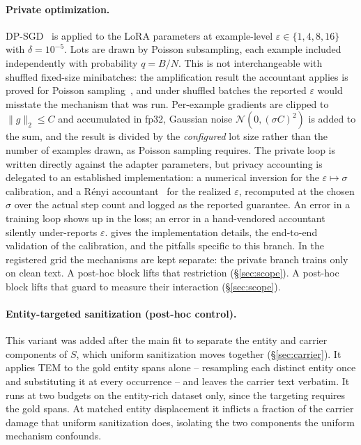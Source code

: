 \paragraph{Private optimization.}
DP-SGD~\citep{abadi2016deep} is applied to the LoRA parameters at example-level $\varepsilon \in \{1, 4, 8, 16\}$ with $\delta = 10^{-5}$.
Lots are drawn by Poisson subsampling,
each example included independently with probability $q = B/N$.
This is not interchangeable with shuffled fixed-size minibatches:
the amplification result the accountant applies is proved for Poisson sampling~\citep{mironov2019sgm},
and under shuffled batches the reported $\varepsilon$ would misstate the mechanism that was run.
Per-example gradients are clipped to $\lVert g \rVert_2 \le C$ and accumulated in fp32,
Gaussian noise $\mathcal{N}(0, (\sigma C)^2)$ is added to the sum,
and the result is divided by the \textit{configured} lot size rather than the number of examples drawn,
as Poisson sampling requires.
The private loop is written directly against the adapter parameters,
but privacy accounting is delegated to an established implementation:
a numerical inversion for the $\varepsilon \mapsto \sigma$ calibration,
and a R\'enyi accountant~\citep{mironov2017renyi} for the realized $\varepsilon$,
recomputed at the chosen $\sigma$ over the actual step count and logged as the reported guarantee.
An error in a training loop shows up in the loss;
an error in a hand-vendored accountant silently under-reports $\varepsilon$.
 gives the implementation details,
the end-to-end validation of the calibration,
and the pitfalls specific to this branch.
In the registered grid the mechanisms are kept separate:
the private branch trains only on clean text.
A post-hoc block lifts that restriction (\S\ref{sec:scope}).
A post-hoc block lifts that guard to measure their interaction (\S\ref{sec:scope}).

\paragraph{Entity-targeted sanitization (post-hoc control).}
This variant was added after the main fit to separate the entity and carrier components of $S$,
which uniform sanitization moves together (\S\ref{sec:carrier}).
It applies TEM to the gold entity spans alone -- resampling each distinct entity once and substituting it at every occurrence -- and leaves the carrier text verbatim.
It runs at two budgets on the entity-rich dataset only,
since the targeting requires the gold spans.
At matched entity displacement it inflicts a fraction of the carrier damage that uniform sanitization does,
isolating the two components the uniform mechanism confounds.

